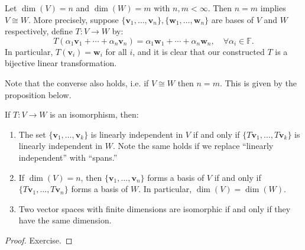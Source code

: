 \begin{example} \label{eg:isodim}
Let \(\dim(V) = n\) and  \(\dim(W) =m \) with \( n,m < \infty\). Then $n = m$ implies \(V \cong W\). More precisely, suppose \(\{ \mathbf{v}_1, \ldots, \mathbf{v}_n \}, \{ \mathbf{w}_1, \ldots, \mathbf{w}_n \}\) are bases of \(V\) and \(W\) respectively, define \(T : V \rightarrow W\) by:
\[
T(\alpha_1 \mathbf{v}_1 + \cdots + \alpha_n \mathbf{v}_n) = \alpha_1 \mathbf{w}_1 + \cdots + \alpha_n \mathbf{w}_n, \quad \forall \alpha_i \in \mathbb{F}.
\]
In particular, \(T(\mathbf{v}_i) = \mathbf{w}_i\) for all \(i\), and it is clear that our constructed \(T\) is a bijective linear transformation.

Note that the converse also holds, i.e. if $V \cong W$ then $n = m$. This is given by the proposition below.
\end{example}


\begin{proposition}\label{prop: isomorphism-properties}
If \(T : V \rightarrow W\) is an isomorphism, then:
\begin{enumerate}
  \item The set \(\{ \mathbf{v}_1, \ldots, \mathbf{v}_k \}\) is linearly independent in \(V\) if and only if \(\{ T\mathbf{v}_1, \ldots, T\mathbf{v}_k \}\) is linearly independent in \(W\).
  Note the same holds if we replace ``linearly independent'' with ``spans.''
  \item If \(\dim(V) = n\), then \(\{ \mathbf{v}_1, \ldots, \mathbf{v}_n \}\) forms a basis of \(V\) if and only if \(\{ T\mathbf{v}_1, \ldots, T\mathbf{v}_n \}\) forms a basis of \(W\). In particular, \(\dim(V) = \dim(W)\).
  \item Two vector spaces with finite dimensions are isomorphic if and only if they have the same dimension.
\end{enumerate}
\end{proposition}

\begin{proof}
Exercise. %
\end{proof}


